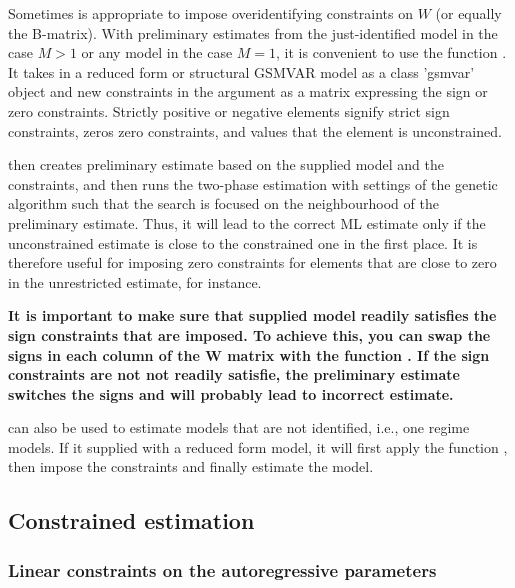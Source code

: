 \documentclass[nojss]{jss}
\begin{document}
Sometimes is appropriate to impose overidentifying constraints on $W$ (or equally the B-matrix). With preliminary estimates from the just-identified model in the case $M>1$ or any model in the case $M=1$, it is convenient to use the function . It takes in a reduced form or structural GSMVAR model as a class 'gsmvar' object and new constraints in the argument  as a matrix expressing the sign or zero constraints. Strictly positive or negative elements signify strict sign constraints, zeros zero constraints, and  values that the element is unconstrained.

 then creates preliminary estimate based on the supplied model and the constraints, and then runs the two-phase estimation with settings of the genetic algorithm such that the search is focused on the neighbourhood of the preliminary estimate. Thus, it will lead to the correct ML estimate only if the unconstrained estimate is close to the constrained one in the first place. It is therefore useful for imposing zero constraints for elements that are close to zero in the unrestricted estimate, for instance.

\textbf{It is important to make sure that supplied model readily satisfies the sign constraints that are imposed. To achieve this, you can swap the signs in each column of the W matrix with the function . If the sign constraints are not not readily satisfie, the preliminary estimate switches the signs and will probably lead to incorrect estimate.}

 can also be used to estimate models that are not identified, i.e., one regime models. If it supplied with a reduced form model, it will first apply the function , then impose the constraints and finally estimate the model.

\subsection{Constrained estimation}\label{sec:examp_const}

\subsubsection{Linear constraints on the autoregressive parameters}
\end{document}
